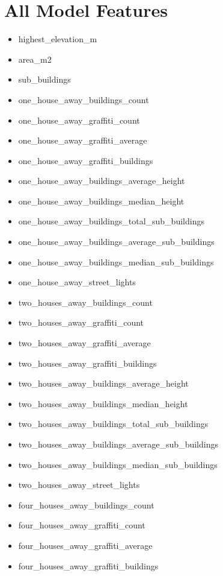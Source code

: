 \chapter{All Model Features}\label{app:all_model_features}

\begin{itemize}
  \item highest\_elevation\_m
  \item area\_m2
  \item sub\_buildings
  \item one\_house\_away\_buildings\_count
  \item one\_house\_away\_graffiti\_count
  \item one\_house\_away\_graffiti\_average
  \item one\_house\_away\_graffiti\_buildings
  \item one\_house\_away\_buildings\_average\_height
  \item one\_house\_away\_buildings\_median\_height
  \item one\_house\_away\_buildings\_total\_sub\_buildings
  \item one\_house\_away\_buildings\_average\_sub\_buildings
  \item one\_house\_away\_buildings\_median\_sub\_buildings
  \item one\_house\_away\_street\_lights
  \item two\_houses\_away\_buildings\_count
  \item two\_houses\_away\_graffiti\_count
  \item two\_houses\_away\_graffiti\_average
  \item two\_houses\_away\_graffiti\_buildings
  \item two\_houses\_away\_buildings\_average\_height
  \item two\_houses\_away\_buildings\_median\_height
  \item two\_houses\_away\_buildings\_total\_sub\_buildings
  \item two\_houses\_away\_buildings\_average\_sub\_buildings
  \item two\_houses\_away\_buildings\_median\_sub\_buildings
  \item two\_houses\_away\_street\_lights
  \item four\_houses\_away\_buildings\_count
  \item four\_houses\_away\_graffiti\_count
  \item four\_houses\_away\_graffiti\_average
  \item four\_houses\_away\_graffiti\_buildings

\end{itemize}
